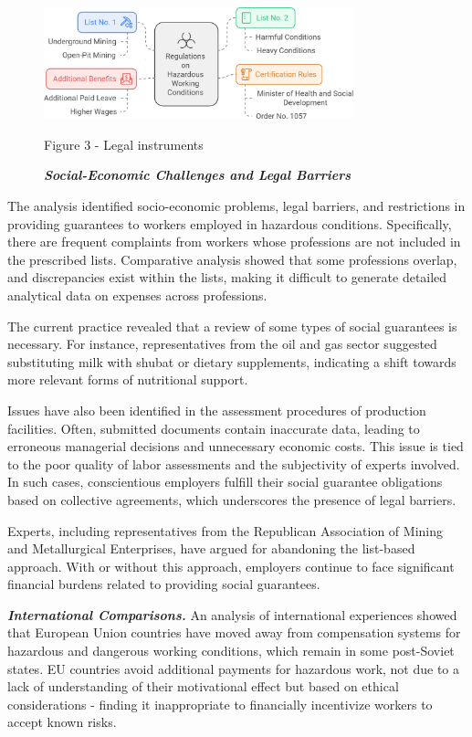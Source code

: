 \begin{figure}[H]
	\centering
	\includegraphics[width=0.8\textwidth]{media/gorn/image4}
	\caption*{Figure 3 - Legal instruments}
	\caption*{\emph{{\bfseries Social-Economic Challenges and Legal Barriers}}}
\end{figure}

\begin{multicols}{2}
The analysis identified socio-economic problems, legal barriers, and
restrictions in providing guarantees to workers employed in hazardous
conditions. Specifically, there are frequent complaints from workers
whose professions are not included in the prescribed lists. Comparative
analysis showed that some professions overlap, and discrepancies exist
within the lists, making it difficult to generate detailed analytical
data on expenses across professions.

The current practice revealed that a review of some types of social
guarantees is necessary. For instance, representatives from the oil and
gas sector suggested substituting milk with shubat or dietary
supplements, indicating a shift towards more relevant forms of
nutritional support.

Issues have also been identified in the assessment procedures of
production facilities. Often, submitted documents contain inaccurate
data, leading to erroneous managerial decisions and unnecessary economic
costs. This issue is tied to the poor quality of labor assessments and
the subjectivity of experts involved. In such cases, conscientious
employers fulfill their social guarantee obligations based on collective
agreements, which underscores the presence of legal barriers.

Experts, including representatives from the Republican Association of
Mining and Metallurgical Enterprises, have argued for abandoning the
list-based approach. With or without this approach, employers continue
to face significant financial burdens related to providing social
guarantees.

\emph{{\bfseries International Comparisons.}} An analysis of international
experiences showed that European Union countries have moved away from
compensation systems for hazardous and dangerous working conditions,
which remain in some post-Soviet states. EU countries avoid additional
payments for hazardous work, not due to a lack of understanding of their
motivational effect but based on ethical considerations - finding it
inappropriate to financially incentivize workers to accept known risks.


\end{multicols}
